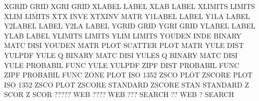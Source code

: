 XGRID                                   GRID
XGRI                                    GRID
XLABEL                                  LABEL
XLAB                                    LABEL
XLIMITS                                 LIMITS
XLIM                                    LIMITS
XTX      INVE                           XTXINV   MATR
Y1LABEL                                 LABEL
Y1LA                                    LABEL
Y2LABEL                                 LABEL
Y2LA                                    LABEL
YGRID                                   GRID
YGRI                                    GRID
YLABEL                                  LABEL
YLAB                                    LABEL
YLIMITS                                 LIMITS
YLIM                                    LIMITS
YOUDEN   INDE                           BINARY   MATC DISI
YOUDEN   MATR PLOT                      SCATTER  PLOT MATR
YULE     DIST                           YULPDF
YULE     Q                              BINARY   MATC DISI
YULES    Q                              BINARY   MATC DISI
YULE                                    PROBABIL FUNC
YULE                                    YULPDF
ZIPF     DIST                           PROBABIL FUNC
ZIPF                                    PROBABIL FUNC
ZONE     PLOT                           ISO      1352 ZSCO PLOT
ZSCORE   PLOT                           ISO      1352 ZSCO PLOT
ZSCORE                                  STANDARD
ZSCORE   STAN                           STANDARD
Z        SCOR                           Z        SCOR
?????                                   WEB
????                                    WEB
???                                     SEARCH
??                                      WEB
?                                       SEARCH
